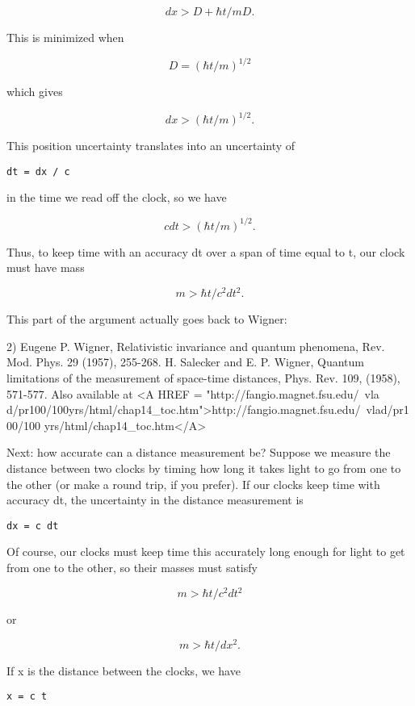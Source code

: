 $$
dx > D + \hbar  t/mD.  
$$
    
This is minimized when 

$$
D = (\hbar  t/m)^{1/2}
$$
    
which gives 

$$
dx > (\hbar  t/m)^{1/2}.
$$
    
This position uncertainty translates into an uncertainty of

\begin{verbatim}
dt = dx / c
\end{verbatim}
    
in the time we read off the clock, so we have 

$$
c dt > (\hbar  t/m)^{1/2}.
$$
    
Thus, to keep time with an accuracy dt over a span of time
equal to t, our clock must have mass

$$
m > \hbar  t / c^{2} dt^{2}.
$$
    
This part of the argument actually goes back to Wigner:

2) 
Eugene P. Wigner, Relativistic invariance and
quantum phenomena, Rev. Mod. Phys. 29
(1957), 255-268.
H. Salecker and E. P. Wigner, Quantum limitations of
the measurement of space-time distances, Phys. Rev. 109,
(1958), 571-577.  Also available at <A HREF = "http://fangio.magnet.fsu.edu/~vla
d/pr100/100yrs/html/chap14_toc.htm">http://fangio.magnet.fsu.edu/~vlad/pr100/100
yrs/html/chap14_toc.htm</A>

Next: how accurate can a distance measurement be?  Suppose we measure
the distance between two clocks by timing how long it takes light to
go from one to the other (or make a round trip, if you prefer).  If
our clocks keep time with accuracy dt, the uncertainty in the distance
measurement is

\begin{verbatim}
dx = c dt
\end{verbatim}
    
Of course, our clocks must keep time this accurately long enough for
light to get from one to the other, so their masses must satisfy

$$
m > \hbar  t / c^{2} dt^{2}
$$
    
or

$$
m > \hbar  t / dx^{2}.
$$
    
If x is the distance between the clocks, we have

\begin{verbatim}
x = c t 
\end{verbatim}
    
